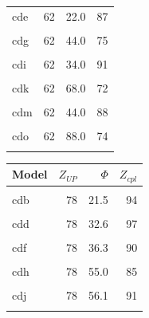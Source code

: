 \begin{table}
\begin{tabular}[t]{lrrr}
cde & 62 & 22.0 & 87\\
\cellcolor{gray!6}{cdf} & \cellcolor{gray!6}{62} & \cellcolor{gray!6}{36.3} & \cellcolor{gray!6}{82}\\
cdg & 62 & 44.0 & 75\\
\cellcolor{gray!6}{cdh} & \cellcolor{gray!6}{62} & \cellcolor{gray!6}{55.0} & \cellcolor{gray!6}{70}\\
cdi & 62 & 34.0 & 91\\
\cellcolor{gray!6}{cdj} & \cellcolor{gray!6}{62} & \cellcolor{gray!6}{56.1} & \cellcolor{gray!6}{77}\\
cdk & 62 & 68.0 & 72\\
\cellcolor{gray!6}{cdl} & \cellcolor{gray!6}{62} & \cellcolor{gray!6}{85.0} & \cellcolor{gray!6}{67}\\
cdm & 62 & 44.0 & 88\\
\cellcolor{gray!6}{cdn} & \cellcolor{gray!6}{62} & \cellcolor{gray!6}{72.6} & \cellcolor{gray!6}{77}\\
cdo & 62 & 88.0 & 74\\
\cellcolor{gray!6}{cdp} & \cellcolor{gray!6}{62} & \cellcolor{gray!6}{110.0} & \cellcolor{gray!6}{75}\\
\bottomrule
\end{tabular}
\centering
\begin{tabular}[t]{lrrr}
\toprule
Model & $Z_{UP}$ & $\Phi$ & \vphantom{1} $Z_{cpl}$\\
\midrule
\cellcolor{gray!6}{cda} & \cellcolor{gray!6}{78} & \cellcolor{gray!6}{13.0} & \cellcolor{gray!6}{87}\\
cdb & 78 & 21.5 & 94\\
\cellcolor{gray!6}{cdc} & \cellcolor{gray!6}{78} & \cellcolor{gray!6}{26.1} & \cellcolor{gray!6}{97}\\
cdd & 78 & 32.6 & 97\\
\cellcolor{gray!6}{cde} & \cellcolor{gray!6}{78} & \cellcolor{gray!6}{22.0} & \cellcolor{gray!6}{90}\\
cdf & 78 & 36.3 & 90\\
\cellcolor{gray!6}{cdg} & \cellcolor{gray!6}{78} & \cellcolor{gray!6}{44.0} & \cellcolor{gray!6}{88}\\
cdh & 78 & 55.0 & 85\\
\cellcolor{gray!6}{cdi} & \cellcolor{gray!6}{78} & \cellcolor{gray!6}{34.0} & \cellcolor{gray!6}{97}\\
cdj & 78 & 56.1 & 91\\
\cellcolor{gray!6}{cdk} & \cellcolor{gray!6}{78} & \cellcolor{gray!6}{68.0} & \cellcolor{gray!6}{84}\\

\end{tabular}
\end{table}
